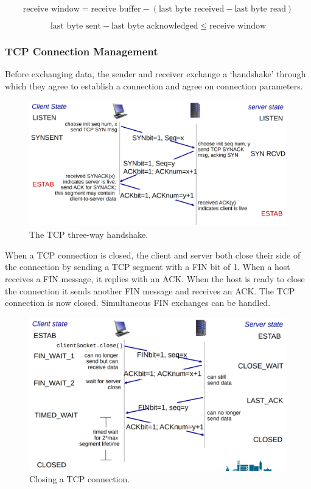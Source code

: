 \begin{equation*}
  \text{receive window} = \text{receive buffer} - \left( \text{last byte received} - \text{last byte read} \right)
\end{equation*}

\begin{equation*}
  \text{last byte sent} - \text{last byte acknowledged} \le \text{receive window}
\end{equation*}

\subsubsection{TCP Connection Management}

Before exchanging data, the sender and receiver exchange a `handshake' through which they agree to establish a connection and agree on connection parameters.

\begin{figure}[htp]
  \centering
  \includegraphics[width=12cm]{unit-18/figures/three-way-handshake.png}
  \caption*{The TCP three-way handshake.}
\end{figure}

When a TCP connection is closed, the client and server both close their side of the connection by sending a TCP segment with a FIN bit of \num{1}.
When a host receives a FIN message, it replies with an ACK\@.
When the host is ready to close the connection it sends another FIN message and receives an ACK\@.
The TCP connection is now closed.
Simultaneous FIN exchanges can be handled.

\begin{figure}[htp]
  \centering
  \includegraphics[width=12cm]{unit-18/figures/closing-connection.png}
  \caption*{Closing a TCP connection.}
\end{figure}
